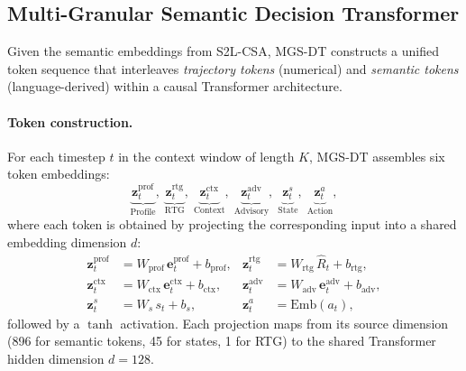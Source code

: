 \subsection{Multi-Granular Semantic Decision Transformer}
\label{sec:mgsdt}

Given the semantic embeddings from S2L-CSA, MGS-DT constructs a unified token sequence that interleaves \textit{trajectory tokens} (numerical) and \textit{semantic tokens} (language-derived) within a causal Transformer architecture.

\paragraph{Token construction.} For each timestep $t$ in the context window of length $K$, MGS-DT assembles six token embeddings:
\begin{equation}
    \underbrace{\mathbf{z}^{\text{prof}}_t}_{\text{Profile}},\;
    \underbrace{\mathbf{z}^{\text{rtg}}_t}_{\text{RTG}},\;
    \underbrace{\mathbf{z}^{\text{ctx}}_t}_{\text{Context}},\;
    \underbrace{\mathbf{z}^{\text{adv}}_t}_{\text{Advisory}},\;
    \underbrace{\mathbf{z}^{s}_t}_{\text{State}},\;
    \underbrace{\mathbf{z}^{a}_t}_{\text{Action}},
\end{equation}
where each token is obtained by projecting the corresponding input into a shared embedding dimension $d$:
\begin{align}
    \mathbf{z}^{\text{prof}}_t &= W_{\text{prof}}\,\mathbf{e}^{\text{prof}}_t + b_{\text{prof}}, &
    \mathbf{z}^{\text{rtg}}_t &= W_{\text{rtg}}\,\hat{R}_t + b_{\text{rtg}}, \\
    \mathbf{z}^{\text{ctx}}_t &= W_{\text{ctx}}\,\mathbf{e}^{\text{ctx}}_t + b_{\text{ctx}}, &
    \mathbf{z}^{\text{adv}}_t &= W_{\text{adv}}\,\mathbf{e}^{\text{adv}}_t + b_{\text{adv}}, \\
    \mathbf{z}^{s}_t &= W_s\,s_t + b_s, &
    \mathbf{z}^{a}_t &= \text{Emb}(a_t),
\end{align}
followed by a $\tanh$ activation. Each projection maps from its source dimension (896 for semantic tokens, 45 for states, 1 for RTG) to the shared Transformer hidden dimension $d = 128$.

